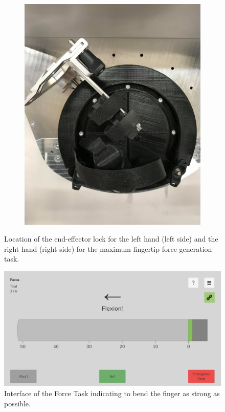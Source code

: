 \documentclass[10pt,oneside,a4paper]{article}
\begin{document}
\begin{figure}[h!]
\begin{subfigure}[b]{0.48\textwidth}
	\includegraphics[width=\textwidth]{images/Hardware/ForceTask2.jpg}
\end{subfigure}
\caption{Location of the end-effector lock for the left hand (left side) and the right hand (right side) for the maximum fingertip force generation task.}
\label{fig:EndeffoctorLock}
\end{figure}

\begin{figure}[h!]
\begin{center}
\includegraphics[width=0.7\columnwidth]{images/Assessments/Force.png}
\caption{Interface of the Force Task indicating to bend the finger as strong as possible.}
\label{fig:ForceTask}
\end{center}
\end{figure}
\end{document}
